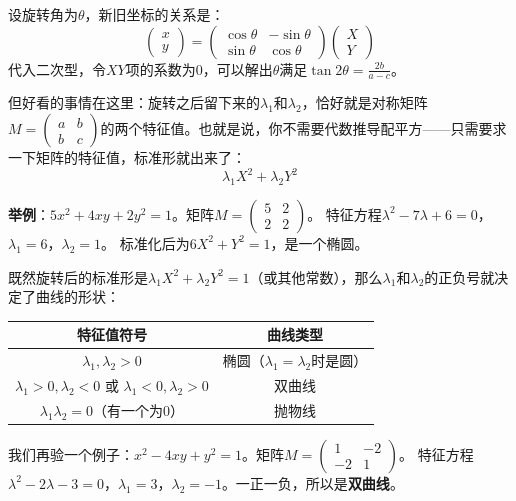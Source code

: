 \documentclass[a4paper,12pt]{ctexart}
\begin{document}
设旋转角为$\theta$，新旧坐标的关系是：
\[
\begin{pmatrix}x\\y\end{pmatrix}=
\begin{pmatrix}\cos\theta&-\sin\theta\\\sin\theta&\cos\theta\end{pmatrix}
\begin{pmatrix}X\\Y\end{pmatrix}
\]
代入二次型，令$XY$项的系数为$0$，可以解出$\theta$满足$\tan2\theta=\frac{2b}{a-c}$。

但好看的事情在这里：旋转之后留下来的$\lambda_1$和$\lambda_2$，恰好就是对称矩阵$M=\begin{pmatrix}a&b\\b&c\end{pmatrix}$的两个特征值。也就是说，你不需要代数推导配平方——只需要求一下矩阵的特征值，标准形就出来了：
\[
\lambda_1X^2+\lambda_2Y^2
\]

\textbf{举例}：$5x^2+4xy+2y^2=1$。矩阵$M=\begin{pmatrix}5&2\\2&2\end{pmatrix}$。
特征方程$\lambda^2-7\lambda+6=0$，$\lambda_1=6$，$\lambda_2=1$。
标准化后为$6X^2+Y^2=1$，是一个椭圆。


既然旋转后的标准形是$\lambda_1X^2+\lambda_2Y^2=1$（或其他常数），那么$\lambda_1$和$\lambda_2$的正负号就决定了曲线的形状：

\begin{center}
\begin{tabular}{c|c}
\textbf{特征值符号} & \textbf{曲线类型}\\\hline
$\lambda_1,\lambda_2>0$ & 椭圆（$\lambda_1=\lambda_2$时是圆）\\
$\lambda_1>0,\lambda_2<0$ 或 $\lambda_1<0,\lambda_2>0$ & 双曲线\\
$\lambda_1\lambda_2=0$（有一个为$0$）& 抛物线
\end{tabular}
\end{center}

我们再验一个例子：$x^2-4xy+y^2=1$。矩阵$M=\begin{pmatrix}1&-2\\-2&1\end{pmatrix}$。
特征方程$\lambda^2-2\lambda-3=0$，$\lambda_1=3$，$\lambda_2=-1$。一正一负，所以是\textbf{双曲线}。
\end{document}
